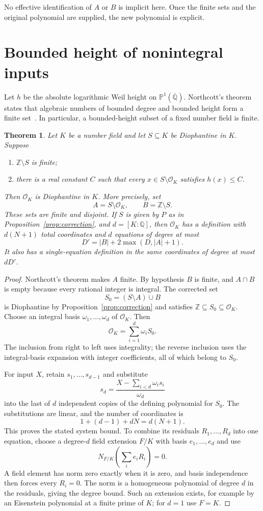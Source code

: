 \documentclass[11pt,a4paper]{article}
\newtheorem{theorem}{Theorem}[section]
\newcommand{\Z}{\mathbb Z}\newcommand{\Q}{\mathbb Q}
\newcommand{\OK}{\mathcal O_K}
\begin{document}
No effective identification of $A$ or $B$ is implicit here.
Once the finite sets and the original polynomial are supplied,
the new polynomial is explicit.

\section{Bounded height of nonintegral inputs}
Let $h$ be the absolute logarithmic Weil height on
$\mathbb P^1(\overline{\Q})$. Northcott's theorem states that
algebraic numbers of bounded degree and bounded height form a
finite set~\cite[Theorem B.2.3]{HS}. In particular, a bounded-height
subset of a fixed number field is finite.

\begin{theorem}\label{thm:integers}
Let $K$ be a number field and let $S\subseteq K$ be Diophantine
in $K$. Suppose
\begin{enumerate}
\item $\Z\setminus S$ is finite;
\item there is a real constant $C$ such that every
      $x\in S\setminus\OK$ satisfies $h(x)\le C$.
\end{enumerate}
Then $\OK$ is Diophantine in $K$.
More precisely, set
\[
 A=S\setminus\OK,\qquad B=\Z\setminus S.
\]
These sets are finite and disjoint. If $S$ is given by $P$ as in
Proposition~\ref{prop:correction}, and $d=[K:\Q]$, then
$\OK$ has a definition with $d(N+1)$ total coordinates and
$d$ equations of degree at most
\[
 D'=|B|+2\max(D,|A|+1).
\]
It also has a single-equation definition in the same coordinates
of degree at most $dD'$.
\end{theorem}
\begin{proof}
Northcott's theorem makes $A$ finite. By hypothesis $B$ is finite,
and $A\cap B$ is empty because every rational integer is integral.
The corrected set
\[
 S_0=(S\setminus A)\cup B
\]
is Diophantine by Proposition~\ref{prop:correction} and satisfies
$\Z\subseteq S_0\subseteq\OK$.
Choose an integral basis $\omega_1,\ldots,\omega_d$ of $\OK$.
Then
\[
                    \OK=\sum_{i=1}^d\omega_iS_0.
\]
The inclusion from right to left uses integrality; the reverse
inclusion uses the integral-basis expansion with integer
coefficients, all of which belong to $S_0$.

For input $X$, retain $s_1,\ldots,s_{d-1}$ and substitute
\[
 s_d=\frac{X-\sum_{i<d}\omega_i s_i}{\omega_d}
\]
into the last of $d$ independent copies of the defining
polynomial for $S_0$. The substitutions are linear, and the
number of coordinates is
\[
 1+(d-1)+dN=d(N+1).
\]
This proves the stated system bound.
To combine its residuals $R_1,\ldots,R_d$ into one equation,
choose a degree-$d$ field extension $F/K$ with basis
$e_1,\ldots,e_d$ and use
\[
                  N_{F/K}\left(\sum_i e_iR_i\right)=0.
\]
A field element has norm zero exactly when it is zero, and
basis independence then forces every $R_i=0$. The norm is a
homogeneous polynomial of degree $d$ in the residuals, giving
the degree bound. Such an extension exists, for example by an
Eisenstein polynomial at a finite prime of $K$; for $d=1$ use
$F=K$.
\end{proof}
\end{document}
